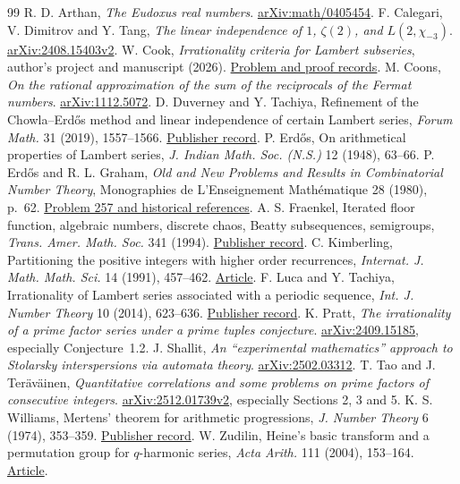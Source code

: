 \documentclass[11pt,letterpaper]{article}
\begin{document}
\begin{thebibliography}{99}
 R. D. Arthan, \emph{The Eudoxus real numbers}.
\href{https://arxiv.org/abs/math/0405454}{arXiv:math/0405454}.
 F. Calegari, V. Dimitrov and Y. Tang,
\emph{The linear independence of $1$, $\zeta(2)$, and $L(2,\chi_{-3})$}.
\href{https://arxiv.org/abs/2408.15403v2}{arXiv:2408.15403v2}.
 W. Cook, \emph{Irrationality criteria for Lambert subseries},
author's project and manuscript (2026).
\href{https://wcook04.github.io/plectis/maths/problems/erdos_257.html}{Problem and proof records}.
 M. Coons, \emph{On the rational approximation of the sum of the reciprocals of the Fermat numbers}.
\href{https://arxiv.org/abs/1112.5072}{arXiv:1112.5072}.
 D. Duverney and Y. Tachiya, Refinement of the Chowla--Erd\H{o}s method and linear independence of certain Lambert series,
\emph{Forum Math.} 31 (2019), 1557--1566. \href{https://doi.org/10.1515/forum-2018-0299}{Publisher record}.
 P. Erd\H{o}s, On arithmetical properties of Lambert series,
\emph{J. Indian Math. Soc. (N.S.)} 12 (1948), 63--66.
 P. Erd\H{o}s and R. L. Graham, \emph{Old and New Problems and Results in Combinatorial Number Theory}, Monographies de L'Enseignement Math\'ematique 28 (1980), p.~62.
\href{https://www.erdosproblems.com/257}{Problem 257 and historical references}.
 A. S. Fraenkel, Iterated floor function, algebraic numbers, discrete chaos, Beatty subsequences, semigroups,
\emph{Trans. Amer. Math. Soc.} 341 (1994).
\href{https://doi.org/10.1090/S0002-9947-1994-1138949-9}{Publisher record}.
 C. Kimberling, Partitioning the positive integers with higher order recurrences,
\emph{Internat. J. Math. Math. Sci.} 14 (1991), 457--462.
\href{https://emis.univie.ac.at/journals/HOA/IJMMS/Volume14_3/721296.pdf}{Article}.
 F. Luca and Y. Tachiya, Irrationality of Lambert series associated with a periodic sequence,
\emph{Int. J. Number Theory} 10 (2014), 623--636. \href{https://doi.org/10.1142/S1793042113501121}{Publisher record}.
 K. Pratt, \emph{The irrationality of a prime factor series under a prime tuples conjecture}.
\href{https://arxiv.org/abs/2409.15185}{arXiv:2409.15185}, especially Conjecture~1.2.
 J. Shallit, \emph{An “experimental mathematics” approach to Stolarsky interspersions via automata theory}.
\href{https://arxiv.org/abs/2502.03312}{arXiv:2502.03312}.
 T. Tao and J. Ter\"av\"ainen, \emph{Quantitative correlations and some problems on prime factors of consecutive integers}.
\href{https://arxiv.org/abs/2512.01739v2}{arXiv:2512.01739v2}, especially Sections 2, 3 and 5.
 K. S. Williams, Mertens' theorem for arithmetic progressions,
\emph{J. Number Theory} 6 (1974), 353--359. \href{https://doi.org/10.1016/0022-314X(74)90032-8}{Publisher record}.
 W. Zudilin, Heine's basic transform and a permutation group for $q$-harmonic series,
\emph{Acta Arith.} 111 (2004), 153--164. \href{https://www.impan.pl/shop/publication/transaction/download/product/82435}{Article}.
\end{thebibliography}
\end{document}
